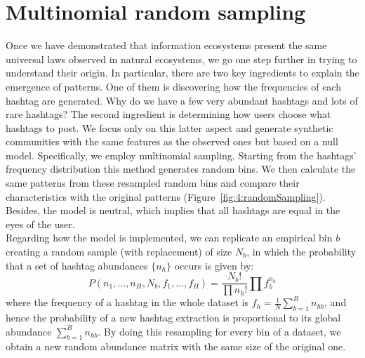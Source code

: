 \section{Multinomial random sampling}
Once we have demonstrated that information ecosystems present the same universal laws observed in natural ecosystems, we go one step further in trying to understand their origin. In particular, there are two key ingredients to explain the emergence of patterns. One of them is discovering how the frequencies of each hashtag are generated. Why do we have a few very abundant hashtags and lots of rare hashtags? The second ingredient is determining how users choose what hashtags to post. We focus only on this latter aspect and generate synthetic communities with the same features as the observed ones but based on a null model. Specifically, we employ multinomial sampling. Starting from the hashtags' frequency distribution this method \cite{lego} generates random bins. We then calculate the same patterns from these resampled random bins and compare their characteristics with the original patterns (Figure~\ref{fig:4:randomSampling}).
Besides, the model is neutral, which implies that all hashtags are equal in the eyes of the user.\\

Regarding how the model is implemented, we can replicate an empirical bin $b$ creating a random sample (with replacement) of size $N_b$, in which the probability that a set of hashtag abundances $ \{n_{h}\}$ occurs is given by:
\begin{equation}
    P(n_1, ... , n_H, N_b, f_1, ... , f_H) = \frac{N_b!}{\prod n_h!} \prod f_h^{n_h}
    \label{eq:multinomial}
\end{equation}
 where the frequency of a hashtag in the whole dataset is $f_h = \frac{1}{N} \sum_{b=1}^B n_{hb}$, and hence the probability of a new hashtag extraction is proportional to its global abundance $\sum_{b = 1}^B n_{hb}$. By doing this resampling for every bin of a dataset, we obtain a new random abundance matrix with the same size of the original one.

